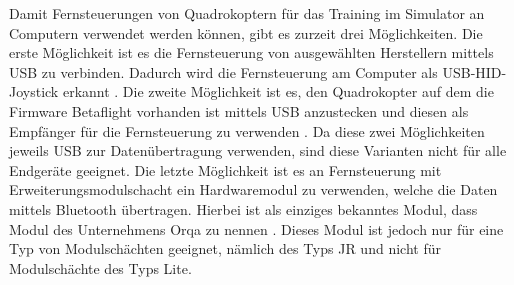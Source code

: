 Damit Fernsteuerungen von Quadrokoptern für das Training im Simulator an Computern verwendet werden können, gibt es zurzeit drei Möglichkeiten. Die erste Möglichkeit ist es die Fernsteuerung von ausgewählten Herstellern mittels USB zu verbinden. Dadurch wird die Fernsteuerung am Computer als USB-\acs{HID}-Joystick erkannt \cite{opentxJoystick}. Die zweite Möglichkeit ist es, den Quadrokopter auf dem die Firmware Betaflight vorhanden ist mittels USB anzustecken und diesen als Empfänger für die Fernsteuerung zu verwenden \cite{betaflightHID}. Da diese zwei Möglichkeiten jeweils USB zur Datenübertragung verwenden, sind diese Varianten nicht für alle Endgeräte geeignet. Die letzte Möglichkeit ist es an Fernsteuerung mit Erweiterungsmodulschacht ein Hardwaremodul zu verwenden, welche die Daten mittels Bluetooth übertragen. Hierbei ist als einziges bekanntes Modul, dass Modul des Unternehmens Orqa zu nennen \cite{orqaBluetoothModule}. Dieses Modul ist jedoch nur für eine Typ von Modulschächten geeignet, nämlich des Typs JR und nicht für Modulschächte des Typs Lite.